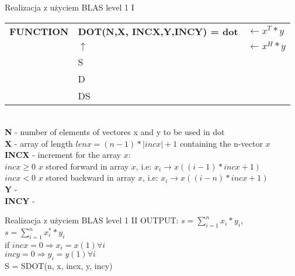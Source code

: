 	\begin{frame}{Realizacja z użyciem BLAS level 1 I}
		\begin{tabular}{ l l l }
			\textbf{FUNCTION} & \textunderscore \textbf{DOT(N,X, INCX,Y,INCY) = dot} & $ \leftarrow x^T * y $ \\
			   & $\uparrow$ & $ \leftarrow x^H * y $ \\
			   & S &  \\
			   & D & \\
			   & DS & \\
		\end{tabular} \\ 
		\textbf{N} - number of elements of vectores x and y to be used in dot \\
		\textbf{X} - array of length $lenx = (n - 1) * |inc x| + 1$ containing the n-vector $x$ \\
		\textbf{INCX} - increment for the array $x$: \\
		$\textit{incx} \geq 0 $ $x$ stored forward in array $x$, i.e: $x_i \rightarrow x((i - 1) * incx + 1)$ \\
		$\textit{incx} < 0$ $x$ stored backward in array $x$, i.e: $x_i \rightarrow x((i - n) * incx + 1)$ \\
		\textbf{Y} - \\
		\textbf{INCY} - \\
	\end{frame}
	\begin{frame}{Realizacja z użyciem BLAS level 1 II}
		OUTPUT: $s = \sum_{i=1}^n x_i * y_i$, $s = \sum_{i=1}^n x_i^{*} * y_i$ \\
		if $incx = 0 \Rightarrow x_i = x(1) \forall i$ \\
		$incy = 0 \Rightarrow y_i = y(1) \forall i$ \\
		S = SDOT(n, x, incx, y, incy)
	\end{frame}
